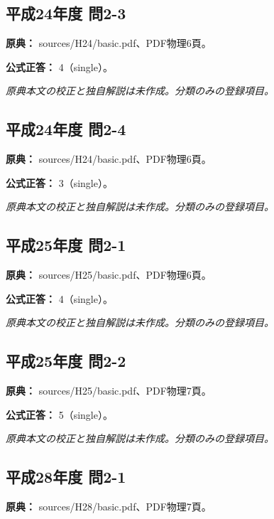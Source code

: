 \subsection{平成24年度 問2-3}
\label{q:h24-reg-basic-2-3}

\noindent\textbf{原典：} sources/H24/basic.pdf、PDF物理6頁。

\textbf{公式正答：} 4（single）。

\par\textit{原典本文の校正と独自解説は未作成。分類のみの登録項目。}

\subsection{平成24年度 問2-4}
\label{q:h24-reg-basic-2-4}

\noindent\textbf{原典：} sources/H24/basic.pdf、PDF物理6頁。

\textbf{公式正答：} 3（single）。

\par\textit{原典本文の校正と独自解説は未作成。分類のみの登録項目。}

\subsection{平成25年度 問2-1}
\label{q:h25-reg-basic-2-1}

\noindent\textbf{原典：} sources/H25/basic.pdf、PDF物理6頁。

\textbf{公式正答：} 4（single）。

\par\textit{原典本文の校正と独自解説は未作成。分類のみの登録項目。}

\subsection{平成25年度 問2-2}
\label{q:h25-reg-basic-2-2}

\noindent\textbf{原典：} sources/H25/basic.pdf、PDF物理7頁。

\textbf{公式正答：} 5（single）。

\par\textit{原典本文の校正と独自解説は未作成。分類のみの登録項目。}

\subsection{平成28年度 問2-1}
\label{q:h28-reg-basic-2-1}

\noindent\textbf{原典：} sources/H28/basic.pdf、PDF物理7頁。

